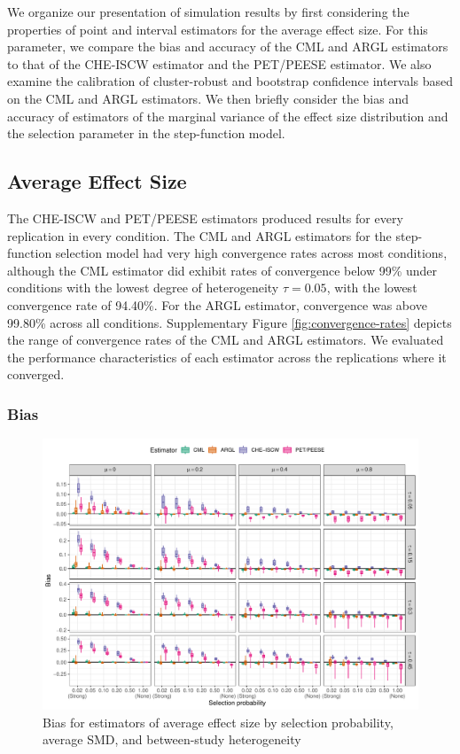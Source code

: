 \documentclass[
  american,
  man, donotrepeattitle,floatsintext]{apa7}
\begin{document}
We organize our presentation of simulation results by first considering the properties of point and interval estimators for the average effect size.
For this parameter, we compare the bias and accuracy of the CML and ARGL estimators to that of the CHE-ISCW estimator and the PET/PEESE estimator.
We also examine the calibration of cluster-robust and bootstrap confidence intervals based on the CML and ARGL estimators.
We then briefly consider the bias and accuracy of estimators of the marginal variance of the effect size distribution and the selection parameter in the step-function model.

\subsection{Average Effect Size}\label{average-effect-size}

The CHE-ISCW and PET/PEESE estimators produced results for every replication in every condition.
The CML and ARGL estimators for the step-function selection model had very high convergence rates across most conditions, although the CML estimator did exhibit rates of convergence below 99\% under conditions with the lowest degree of heterogeneity \(\tau = 0.05\), with the lowest convergence rate of 94.40\%.
For the ARGL estimator, convergence was above 99.80\% across all conditions.
Supplementary Figure \ref{fig:convergence-rates} depicts the range of convergence rates of the CML and ARGL estimators.
We evaluated the performance characteristics of each estimator across the replications where it converged.

\subsubsection{Bias}\label{bias}

\begin{figure}
\includegraphics{step-function-selection-models-with-dependent-effects_files/figure-latex/mu-bias-1} \caption{Bias for estimators of average effect size by selection probability, average SMD, and between-study heterogeneity}\label{fig:mu-bias}
\end{figure}
\end{document}
